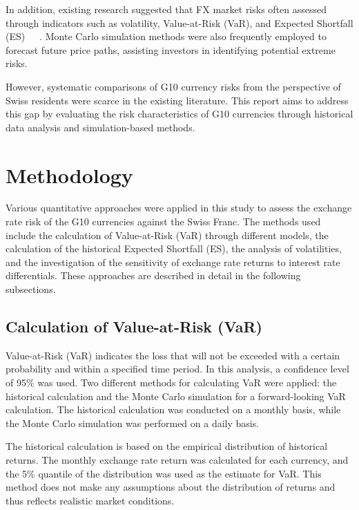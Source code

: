 \documentclass{article}
\begin{document}
In addition, existing research suggested that FX market risks often assessed through indicators such as volatility, Value-at-Risk (VaR), and Expected Shortfall (ES)~\cite{AUBOIN_RUTA_2013}~\cite{dollar_exchange}~\cite{riker2020review}. Monte Carlo simulation methods were also frequently employed to forecast future price paths, assisting investors in identifying potential extreme risks.

However, systematic comparisons of G10 currency risks from the perspective of Swiss residents were scarce in the existing literature. This report aims to address this gap by evaluating the risk characteristics of G10 currencies through historical data analysis and simulation-based methods.

\section{Methodology}

Various quantitative approaches were applied in this study to assess the exchange rate risk of the G10 currencies against the Swiss Franc. The methods used include the calculation of Value-at-Risk (VaR) through different models, the calculation of the historical Expected Shortfall (ES), the analysis of volatilities, and the investigation of the sensitivity of exchange rate returns to interest rate differentials. These approaches are described in detail in the following subsections.

\subsection{Calculation of Value-at-Risk (VaR)}

Value-at-Risk (VaR) indicates the loss that will not be exceeded with a certain probability and within a specified time period. In this analysis, a confidence level of 95\% was used. Two different methods for calculating VaR were applied: the historical calculation and the Monte Carlo simulation for a forward-looking VaR calculation. The historical calculation was conducted on a monthly basis, while the Monte Carlo simulation was performed on a daily basis.

The historical calculation is based on the empirical distribution of historical returns. The monthly exchange rate return was calculated for each currency, and the 5\% quantile of the distribution was used as the estimate for VaR. This method does not make any assumptions about the distribution of returns and thus reflects realistic market conditions.
\end{document}
